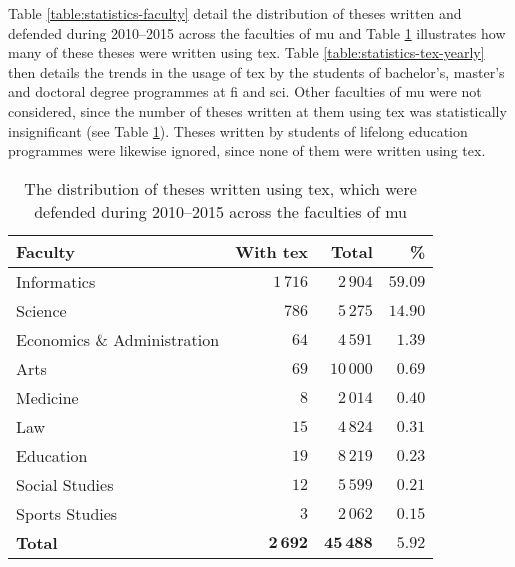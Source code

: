 \documentclass[12pt,twoside,cover,color,table]%
  {fithesis3/fithesis3/fithesis3} %
\begin{document}
  Table \ref{table:statistics-faculty} detail the distribution of
  theses written and defended during 2010--2015 across the
  faculties of \gls{mu} and Table \ref{table:statistics-tex}
  illustrates how many of these theses were written using
  \gls{tex}. Table \ref{table:statistics-tex-yearly} then details
  the trends in the usage of \gls{tex} by the students of
  bachelor's, master's and doctoral degree programmes at \gls{fi}
  and \gls{sci}. Other faculties of \gls{mu} were not considered,
  since the number of theses written at them using \gls{tex} was
  statistically insignificant (see Table
  \ref{table:statistics-tex}). Theses written by students of
  lifelong education programmes were likewise ignored, since none
  of them were written using \gls{tex}.

  \begin{table}
    \caption{The distribution of theses written using \gls{tex},
      which were defended during 2010--2015 across the faculties of
      \acrshort{mu}}
    \begin{tabularx}{\textwidth}{Xrrr}
      \textbf{Faculty} & \textbf{With \gls{tex}} & \textbf{Total} &
      \textbf{\%} \\
      \toprule
      Informatics                 & $1\,716$ & $2\,904$  &
      $59.09$ \\%
      Science                     & $786$     & $5\,275$  &
      $14.90$ \\%
      Economics \& Administration & $64$      & $4\,591$  &
      $1.39$  \\%
      Arts                        & $69$      & $10\,000$ &
      $0.69$  \\%
      Medicine                    & $8$       & $2\,014$  &
      $0.40$  \\%
      Law                         & $15$      & $4\,824$  &
      $0.31$  \\%
      Education                   & $19$      & $8\,219$  &
      $0.23$  \\%
      Social Studies              & $12$      & $5\,599$  &
      $0.21$  \\%
      Sports Studies              & $3$       & $2\,062$  &
      $0.15$  \\%
      \bottomrule
      \textbf{Total} & $\mathbf{2\,692}$ & $\mathbf{45\,488}$ &
      $\mathbf{5.92}$
    \end{tabularx}
    \label{table:statistics-tex}
  \end{table}
\end{document}
